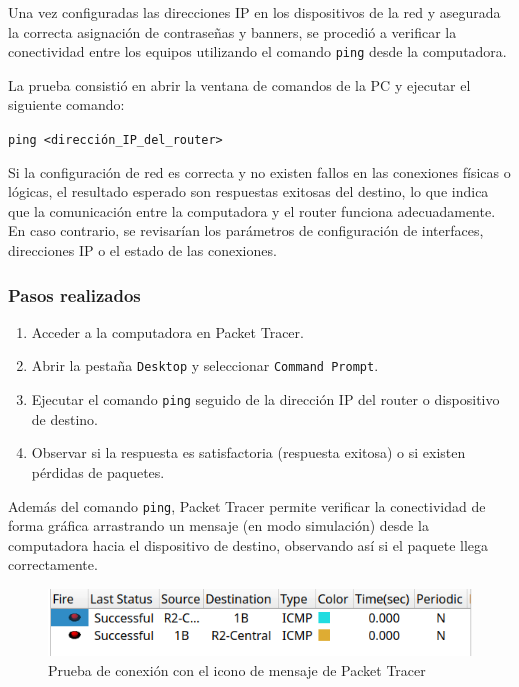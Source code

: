 \documentclass[a4paper,11pt]{article}
\begin{document}
Una vez configuradas las direcciones IP en los dispositivos de la red y
asegurada la correcta asignación de contraseñas y banners, se procedió a
verificar la conectividad entre los equipos utilizando el comando \texttt{ping}
desde la computadora.

La prueba consistió en abrir la ventana de comandos de la PC y ejecutar el
siguiente comando:

\begin{center}
    \texttt{ping <dirección\_IP\_del\_router>}
\end{center}

Si la configuración de red es correcta y no existen fallos en las conexiones
físicas o lógicas, el resultado esperado son respuestas exitosas del destino,
lo que indica que la comunicación entre la computadora y el router funciona
adecuadamente. En caso contrario, se revisarían los parámetros de configuración
de interfaces, direcciones IP o el estado de las conexiones.

\subsubsection*{Pasos realizados}
\begin{enumerate}
    \item Acceder a la computadora en Packet Tracer.
    \item Abrir la pestaña \texttt{Desktop} y seleccionar \texttt{Command Prompt}.
    \item Ejecutar el comando \texttt{ping} seguido de la dirección IP del router o
          dispositivo de destino.
    \item Observar si la respuesta es satisfactoria (respuesta exitosa) o si existen
          pérdidas de paquetes.
\end{enumerate}

Además del comando \texttt{ping}, Packet Tracer permite verificar la
conectividad de forma gráfica arrastrando un mensaje (en modo simulación) desde
la computadora hacia el dispositivo de destino, observando así si el paquete
llega correctamente. \vspace{1cm}

\begin{figure}[h]
    \includegraphics[width=1\textwidth]{images/routers/connectivity_test.png}
    \caption{Prueba de conexión con el icono de mensaje de Packet Tracer}
\end{figure}
\end{document}

